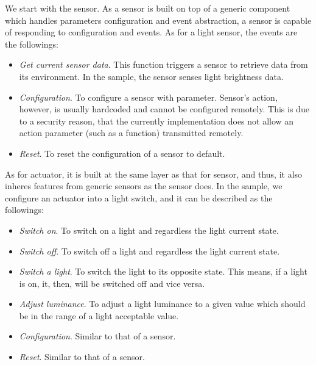 We start with the sensor. As a sensor is built on top of a generic component which handles parameters configuration and event abstraction, a sensor is capable of responding to configuration and events. As for a light sensor, the events are the followings:

\begin{itemize}
\setlength{\itemsep}{0pt}
\item \emph{Get current sensor data}. This function triggers a sensor to retrieve data from its environment. In the sample, the sensor senses light brightness data.
\item \emph{Configuration}. To configure a sensor with parameter. Sensor's action, however, is usually hardcoded and cannot be configured remotely. This is due to a security reason, that the currently implementation does not allow an action parameter (such as a function) transmitted remotely.
\item \emph{Reset}. To reset the configuration of a sensor to default.
\end{itemize}

As for actuator, it is built at the same layer as that for sensor, and thus, it also inheres features from generic sensors as the sensor does. In the sample, we configure an actuator into a light switch, and it can be described as the followings:

\begin{itemize}
\setlength{\itemsep}{0pt}
\item \emph{Switch on}. To switch on a light and regardless the light current state.
\item \emph{Switch off}. To switch off a light and regardless the light current state.
\item \emph{Switch a light}. To switch the light to its opposite state. This means, if a light is on, it, then, will be switched off and vice versa.
\item \emph{Adjust luminance}. To adjust a light luminance to a given value which should be in the range of a light acceptable value.
\item \emph{Configuration}. Similar to that of a sensor.
\item \emph{Reset}. Similar to that of a sensor.
\end{itemize}

